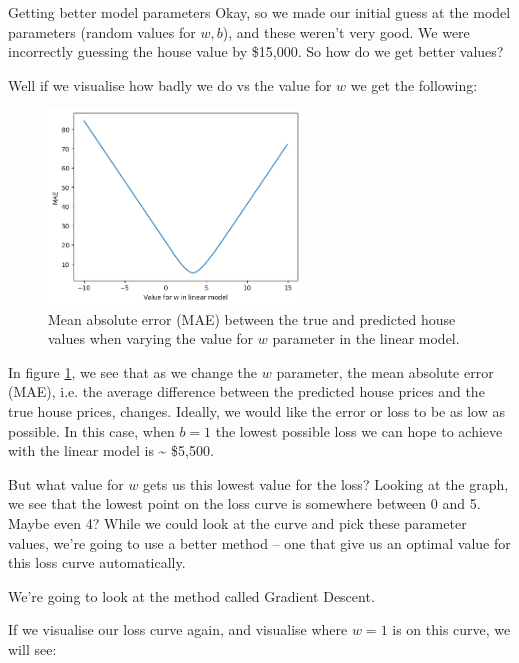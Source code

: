 \documentclass[10pt]{beamer}
\begin{document}
\begin{frame}[fragile,allowframebreaks,label=]{Getting better model parameters}
Okay, so we made our initial guess at the model parameters (random values for \(w,
b\)), and these weren't very good. We were incorrectly guessing the house value by
\$15,000. So how do we get better values?

Well if we visualise how badly we do vs the value for \(w\) we get the following:

\begin{figure}[htbp]
\centering
\includegraphics[width=0.6\textwidth]{images/plot_linear_model_loss_w.png}
\caption{\label{fig:mae_lm}Mean absolute error (MAE) between the true and predicted house values when varying the value for \(w\) parameter in the linear model.}
\end{figure}

In figure \ref{fig:mae_lm}, we see that as we change the \(w\) parameter, the mean absolute
error (MAE), i.e. the average difference between the predicted house prices and the
true house prices, changes. Ideally, we would like the error or \alert{loss} to be as low as
possible. In this case, when \(b = 1\) the lowest possible loss we can hope to achieve
with the linear model is \textasciitilde{} \$5,500.

But what value for \(w\) gets us this lowest value for the loss? Looking at the graph,
we see that the lowest point on the loss curve is somewhere between 0 and 5. Maybe
even 4? While we could look at the curve and pick these parameter values, we're going
to use a better method -- one that give us an optimal value for this loss curve
automatically.

We're going to look at the method called \alert{Gradient Descent}.

If we visualise our loss curve again, and visualise where \(w = 1\) is on this curve,
we will see:


\end{frame}
\end{document}
